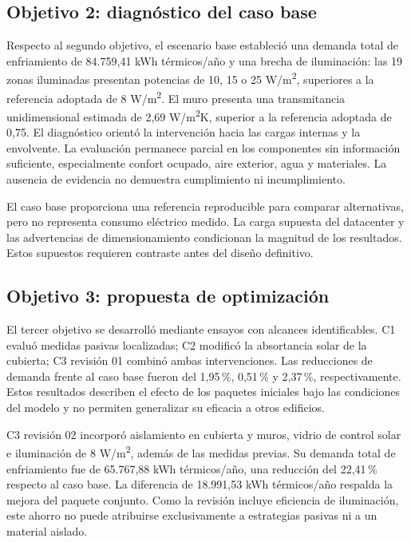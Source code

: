 \subsection{Objetivo 2: diagnóstico del caso base}
\begin{textoDosTercios}
Respecto al segundo objetivo, el escenario base estableció una demanda total de enfriamiento de 84.759,41 kWh térmicos/año y una brecha de iluminación: las 19 zonas iluminadas presentan potencias de 10, 15 o 25 W/m\textsuperscript{2}, superiores a la referencia adoptada de 8 W/m\textsuperscript{2}. El muro presenta una transmitancia unidimensional estimada de 2,69 W/m\textsuperscript{2}K, superior a la referencia adoptada de 0,75. El diagnóstico orientó la intervención hacia las cargas internas y la envolvente. La evaluación permanece parcial en los componentes sin información suficiente, especialmente confort ocupado, aire exterior, agua y materiales. La ausencia de evidencia no demuestra cumplimiento ni incumplimiento.

El caso base proporciona una referencia reproducible para comparar alternativas, pero no representa consumo eléctrico medido. La carga supuesta del datacenter y las advertencias de dimensionamiento condicionan la magnitud de los resultados. Estos supuestos requieren contraste antes del diseño definitivo.
\end{textoDosTercios}

\par\medskip
\subsection{Objetivo 3: propuesta de optimización}
\begin{textoDosTercios}
El tercer objetivo se desarrolló mediante ensayos con alcances identificables. C1 evaluó medidas pasivas localizadas; C2 modificó la absortancia solar de la cubierta; C3 revisión 01 combinó ambas intervenciones. Las reducciones de demanda frente al caso base fueron del 1,95\,\%, 0,51\,\% y 2,37\,\%, respectivamente. Estos resultados describen el efecto de los paquetes iniciales bajo las condiciones del modelo y no permiten generalizar su eficacia a otros edificios.

C3 revisión 02 incorporó aislamiento en cubierta y muros, vidrio de control solar e iluminación de 8 W/m\textsuperscript{2}, además de las medidas previas. Su demanda total de enfriamiento fue de 65.767,88 kWh térmicos/año, una reducción del 22,41\,\% respecto al caso base. La diferencia de 18.991,53 kWh térmicos/año respalda la mejora del paquete conjunto. Como la revisión incluye eficiencia de iluminación, este ahorro no puede atribuirse exclusivamente a estrategias pasivas ni a un material aislado.

\end{textoDosTercios}

